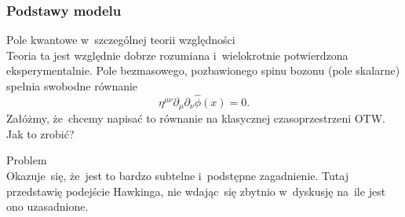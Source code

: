 \documentclass[10pt,t]{beamer}
\begin{document}
\begin{frame}
  \frametitle{Podstawy modelu}


  Pole kwantowe w~szczególnej teorii względności \\
  Teoria ta jest względnie dobrze rozumiana i~wielokrotnie
  potwierdzona eksperymentalnie. Pole bezmasowego, pozbawionego
  spinu bozonu (pole skalarne) spełnia swobodne równanie
  \begin{equation}
    \label{eq:Promieniowanie-Hawkinga-01}
    \eta^{ \mu \nu } \partial_{ \mu } \partial_{ \nu } \widehat{ \phi }( x ) = 0.
  \end{equation}
  Załóżmy, że~chcemy napisać to równanie na klasycznej
  czasoprzestrzeni OTW. Jak to zrobić?

  Problem \\
  Okazuje~się, że~jest to bardzo subtelne i~podstępne zagadnienie.
  Tutaj przedstawię podejście Hawkinga, nie wdając~się zbytnio
  w~dyskusję na~ile jest ono uzasadnione.

\end{frame}
\end{document}
